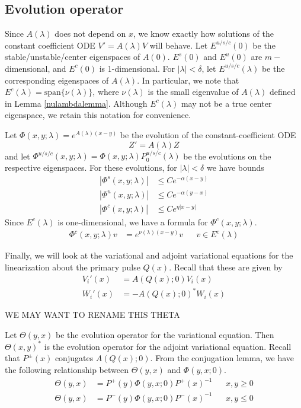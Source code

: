 \documentclass[thesis.tex]{subfiles}
\begin{document}
\subsection{Evolution operator}

Since $A(\lambda)$ does not depend on $x$, we know exactly how solutions of the constant coefficient ODE $V' = A(\lambda)V$ will behave. Let $E^{u/s/c}(0)$ be the stable/unstable/center eigenspaces of $A(0)$. $E^s(0)$ and $E^u(0)$ are $m-$dimensional, and $E^c(0)$ is 1-dimensional. For $|\lambda| < \delta$, let $E^{u/s/c}(\lambda)$ be the corresponding eigenspaces of $A(\lambda)$. In particular, we note that $E^c(\lambda) = \text{span}\{ \nu(\lambda) \}$, where $\nu(\lambda)$ is the small eigenvalue of $A(\lambda)$ defined in Lemma \ref{nulambdalemma}. Although $E^c(\lambda)$ may not be a true center eigenspace, we retain this notation for convenience. 

Let $\Phi(x, y; \lambda) = e^{A(\lambda)(x-y)}$ be the evolution of the constant-coefficient ODE
\[
Z' = A(\lambda) Z
\]
and let $\Phi^{u/s/c}(x, y; \lambda) = \Phi(x, y; \lambda)P^{u/s/c}_0(\lambda)$ be the evolutions on the respective eigenspaces. For these evolutions, for $|\lambda| < \delta$ we have bounds
\begin{equation}\label{Zevolbounds}
\begin{aligned}
|\Phi^s(x, y; \lambda)| &\leq C e^{-\alpha(x - y)} \\
|\Phi^u(x, y; \lambda)| &\leq C e^{-\alpha(y - x)} \\
|\Phi^c(x, y; \lambda)| &\leq C e^{\eta|x - y|} 
\end{aligned}
\end{equation}
Since $E^c(\lambda)$ is one-dimensional, we have a formula for $\Phi^c(x, y; \lambda)$.
\begin{align}\label{centerevol}
\Phi^c(x, y; \lambda) v &= e^{\nu(\lambda)(x - y)} v && v \in E^c(\lambda)
\end{align}

Finally, we will look at the variational and adjoint variational equations for the linearization about the primary pulse $Q(x)$. Recall that these are given by 
\begin{align*}
V_i'(x) &= A(Q(x); 0) V_i(x) \\
W_i'(x) &= -A(Q(x); 0)^* W_i(x)
\end{align*}

WE MAY WANT TO RENAME THIS THETA

Let $\Theta(y, x)$ be the evolution operator for the variational equation. Then $\Theta(x, y)^*$ is the evolution operator for the adjoint variational equation. Recall that $P^\pm(x)$ conjugates $A(Q(x); 0)$. From the conjugation lemma, we have the following relationship between $\Theta(y, x)$ and $\Phi(y, x; 0)$.
\begin{align*}
\Theta(y, x) &= P^+(y) \Phi(y, x; 0) P^+(x)^{-1} && x, y \geq 0 \\
\Theta(y, x) &= P^-(y) \Phi(y, x; 0) P^-(x)^{-1} && x, y \leq 0
\end{align*}
\end{document}
